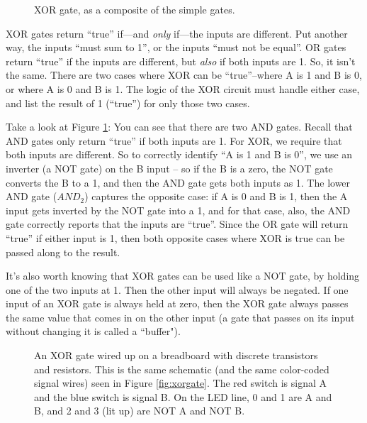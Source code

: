 \bigskip

\begin{figure}[h!]
\begin{center}

\caption{XOR gate, as a composite of the simple gates.}
\label{fig:xorcomposite}
\end{center}
\end{figure}

XOR gates return ``true'' if---and \emph{only} if---the inputs are different. Put another way, the inputs ``must sum to 1'', or the inputs ``must not be equal''. OR gates return ``true'' if the inputs are different, but \emph{also} if both inputs are 1. So, it isn't the same. There are two cases where XOR can be ``true''--where A is 1 and B is 0, or where A is 0 and B is 1. The logic of the XOR circuit must handle either case, and list the result of 1 (``true'') for only those two cases.

Take a look at Figure \ref{fig:xorcomposite}: You can see that there are two AND gates. Recall that AND gates only return ``true'' if both inputs are 1. For XOR, we require that both inputs are different. So to correctly identify ``A is 1 and B is 0'', we use an inverter (a NOT gate) on the B input -- so if the B is a zero, the NOT gate converts the B to a 1, and then the AND gate gets both inputs as 1. The lower AND gate ($AND_2$) captures the opposite case: if A is 0 and B is 1, then the A input gets inverted by the NOT gate into a 1, and for that case, also, the AND gate correctly reports that the inputs are ``true''. Since the OR gate will return ``true'' if either input is 1, then both opposite cases where XOR is true can be passed along to the result. 

It's also worth knowing that XOR gates can be used like a NOT gate, by holding one of the two inputs at 1. Then the other input will always be negated. If one input of an XOR gate is always held at zero, then the XOR gate always passes the same value that comes in on the other input (a gate that passes on its input without changing it is called a ``buffer").

\bigskip

\begin{figure}[!hb]
\begin{center}
\caption{An XOR gate wired up on a breadboard with discrete transistors and resistors. This is the same schematic (and the same color-coded signal wires) seen in Figure \ref{fig:xorgate}. The red switch is signal A and the blue switch is signal B. On the LED line, 0 and 1 are A and B, and 2 and 3 (lit up) are NOT A and NOT B.}
\label{fig:xorbreadboard}
\end{center}
\end{figure}


